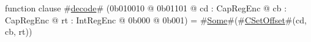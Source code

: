 function clause #\hyperref[zdecode]{decode}# (0b010010 @ 0b01101 @ cd : CapRegEnc @ cb : CapRegEnc @ rt : IntRegEnc @ 0b000 @ 0b001) = #\hyperref[zSome]{Some}#(#\hyperref[zCSetOffset]{CSetOffset}#(cd, cb, rt))
